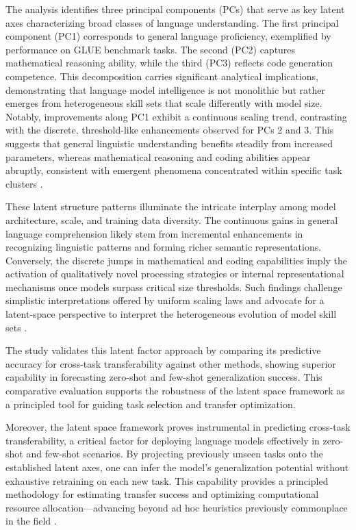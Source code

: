 \documentclass[sigconf]{acmart}
\begin{document}
The analysis identifies three principal components (PCs) that serve as key latent axes characterizing broad classes of language understanding. The first principal component (PC1) corresponds to general language proficiency, exemplified by performance on GLUE benchmark tasks. The second (PC2) captures mathematical reasoning ability, while the third (PC3) reflects code generation competence. This decomposition carries significant analytical implications, demonstrating that language model intelligence is not monolithic but rather emerges from heterogeneous skill sets that scale differently with model size. Notably, improvements along PC1 exhibit a continuous scaling trend, contrasting with the discrete, threshold-like enhancements observed for PCs 2 and 3. This suggests that general linguistic understanding benefits steadily from increased parameters, whereas mathematical reasoning and coding abilities appear abruptly, consistent with emergent phenomena concentrated within specific task clusters \cite{ref45}.

These latent structure patterns illuminate the intricate interplay among model architecture, scale, and training data diversity. The continuous gains in general language comprehension likely stem from incremental enhancements in recognizing linguistic patterns and forming richer semantic representations. Conversely, the discrete jumps in mathematical and coding capabilities imply the activation of qualitatively novel processing strategies or internal representational mechanisms once models surpass critical size thresholds. Such findings challenge simplistic interpretations offered by uniform scaling laws and advocate for a latent-space perspective to interpret the heterogeneous evolution of model skill sets \cite{ref45}.

The study validates this latent factor approach by comparing its predictive accuracy for cross-task transferability against other methods, showing superior capability in forecasting zero-shot and few-shot generalization success. This comparative evaluation supports the robustness of the latent space framework as a principled tool for guiding task selection and transfer optimization.

Moreover, the latent space framework proves instrumental in predicting cross-task transferability, a critical factor for deploying language models effectively in zero-shot and few-shot scenarios. By projecting previously unseen tasks onto the established latent axes, one can infer the model’s generalization potential without exhaustive retraining on each new task. This capability provides a principled methodology for estimating transfer success and optimizing computational resource allocation—advancing beyond ad hoc heuristics previously commonplace in the field \cite{ref45}.
\end{document}
